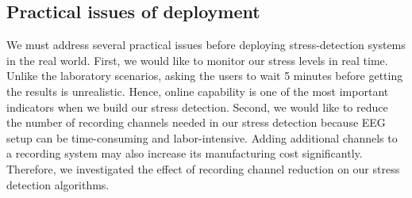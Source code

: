 \documentclass[journal]{IEEEtran}
\begin{document}
\subsection{Practical issues of deployment}
We must address several practical issues before deploying stress-detection systems in the real world.
First, we would like to monitor our stress levels in real time.
Unlike the laboratory scenarios, asking the users to wait 5 minutes before getting the results is unrealistic.
Hence, online capability is one of the most important indicators when we build our stress detection.
Second, we would like to reduce the number of recording channels needed in our stress detection because EEG setup can be time-consuming and labor-intensive.
Adding additional channels to a recording system may also increase its manufacturing cost significantly.
Therefore, we investigated the effect of recording channel reduction on our stress detection algorithms.

\end{document}
